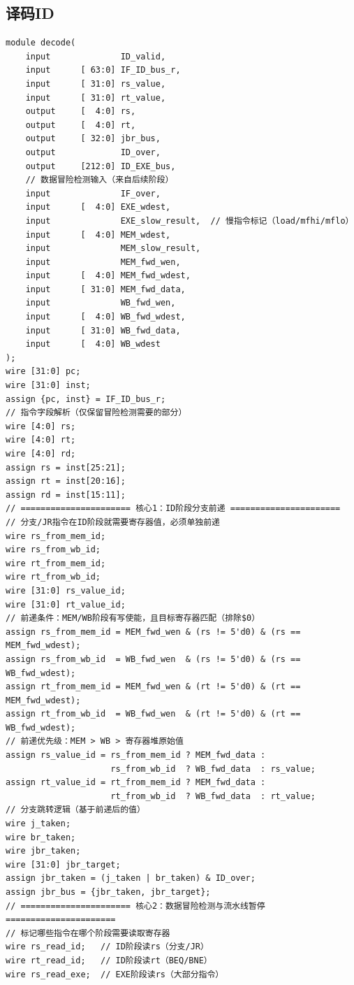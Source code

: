 ﻿\documentclass{article}
\begin{document}
\subsection{译码\textbf{ID}}
\begin{verbatim}
module decode(
    input              ID_valid,
    input      [ 63:0] IF_ID_bus_r,
    input      [ 31:0] rs_value,
    input      [ 31:0] rt_value,
    output     [  4:0] rs,
    output     [  4:0] rt,
    output     [ 32:0] jbr_bus,
    output             ID_over,
    output     [212:0] ID_EXE_bus,
    // 数据冒险检测输入（来自后续阶段）
    input              IF_over,
    input      [  4:0] EXE_wdest,
    input              EXE_slow_result,  // 慢指令标记（load/mfhi/mflo）
    input      [  4:0] MEM_wdest,
    input              MEM_slow_result,
    input              MEM_fwd_wen,
    input      [  4:0] MEM_fwd_wdest,
    input      [ 31:0] MEM_fwd_data,
    input              WB_fwd_wen,
    input      [  4:0] WB_fwd_wdest,
    input      [ 31:0] WB_fwd_data,
    input      [  4:0] WB_wdest
);
wire [31:0] pc;
wire [31:0] inst;
assign {pc, inst} = IF_ID_bus_r;
// 指令字段解析（仅保留冒险检测需要的部分）
wire [4:0] rs;
wire [4:0] rt;
wire [4:0] rd;
assign rs = inst[25:21];
assign rt = inst[20:16];
assign rd = inst[15:11];
// ====================== 核心1：ID阶段分支前递 ======================
// 分支/JR指令在ID阶段就需要寄存器值，必须单独前递
wire rs_from_mem_id;
wire rs_from_wb_id;
wire rt_from_mem_id;
wire rt_from_wb_id;
wire [31:0] rs_value_id;
wire [31:0] rt_value_id;
// 前递条件：MEM/WB阶段有写使能，且目标寄存器匹配（排除$0）
assign rs_from_mem_id = MEM_fwd_wen & (rs != 5'd0) & (rs == MEM_fwd_wdest);
assign rs_from_wb_id  = WB_fwd_wen  & (rs != 5'd0) & (rs == WB_fwd_wdest);
assign rt_from_mem_id = MEM_fwd_wen & (rt != 5'd0) & (rt == MEM_fwd_wdest);
assign rt_from_wb_id  = WB_fwd_wen  & (rt != 5'd0) & (rt == WB_fwd_wdest);
// 前递优先级：MEM > WB > 寄存器堆原始值
assign rs_value_id = rs_from_mem_id ? MEM_fwd_data :
                     rs_from_wb_id  ? WB_fwd_data  : rs_value;
assign rt_value_id = rt_from_mem_id ? MEM_fwd_data :
                     rt_from_wb_id  ? WB_fwd_data  : rt_value;
// 分支跳转逻辑（基于前递后的值）
wire j_taken;
wire br_taken;
wire jbr_taken;
wire [31:0] jbr_target;
assign jbr_taken = (j_taken | br_taken) & ID_over;
assign jbr_bus = {jbr_taken, jbr_target};
// ====================== 核心2：数据冒险检测与流水线暂停 ======================
// 标记哪些指令在哪个阶段需要读取寄存器
wire rs_read_id;   // ID阶段读rs（分支/JR）
wire rt_read_id;   // ID阶段读rt（BEQ/BNE）
wire rs_read_exe;  // EXE阶段读rs（大部分指令）

\end{verbatim}
\end{document}
